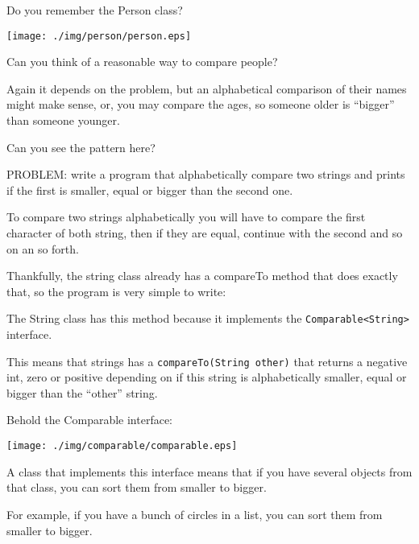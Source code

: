 \documentclass[a4paper, 9pt]{extarticle}
\newcommand{\separator}{\begin{center}%
\noindent\makebox[\linewidth]{\rule{0.75\paperwidth}{0.4pt}}%
\end{center}}
\begin{document}
\separator

Do you remember the Person class?

\begin{center}
  \texttt{[image: ./img/person/person.eps]}
\end{center}

Can you think of a reasonable way to compare people?

Again it depends on the problem, but an alphabetical comparison of their names
might make sense, or, you may compare the ages, so someone
older is ``bigger'' than someone younger.

Can you see the pattern here?

\separator

PROBLEM: write a program that alphabetically compare two strings and prints if
the first is smaller, equal or bigger than the second one.


To compare two strings alphabetically you will have to compare the first
character of both string, then if they are equal, continue with the second and
so on an so forth.

Thankfully, the string class already has a compareTo method that does exactly
that, so the program is very simple to write:


The String class has this method because it implements the \verb+Comparable<String>+ interface.

This means that strings has a \verb+compareTo(String other)+ that returns a
negative int, zero or positive depending on if this string is alphabetically
smaller, equal or bigger than the ``other'' string.

Behold the Comparable interface:

\begin{center}
  \texttt{[image: ./img/comparable/comparable.eps]}
\end{center}

A class that implements this interface means that if you have several objects
from that class, you can sort them from smaller to bigger.

For example, if you have a bunch of circles in a list, you can sort them from smaller to bigger.
\end{document}
